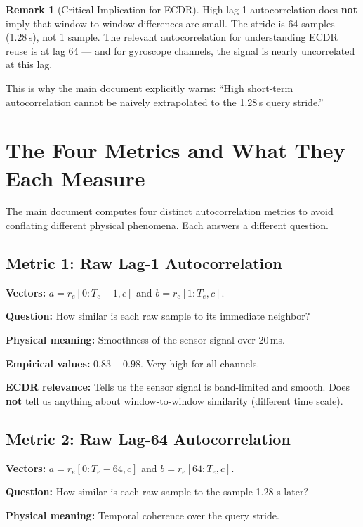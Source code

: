 \documentclass[11pt, a4paper]{article}
\theoremstyle{definition}
\newtheorem{remark}{Remark}[section]
\theoremstyle{plain}
\begin{document}
\begin{remark}[Critical Implication for ECDR]
  High lag-1 autocorrelation does \textbf{not} imply that window-to-window
  differences are small. The stride is 64 samples (1.28\,s), not 1 sample.
  The relevant autocorrelation for understanding ECDR reuse is at lag 64 — and
  for gyroscope channels, the signal is nearly uncorrelated at this lag.

  This is why the main document explicitly warns: ``High short-term autocorrelation
  cannot be naively extrapolated to the 1.28\,s query stride.''
\end{remark}

\section{The Four Metrics and What They Each Measure}

The main document computes four distinct autocorrelation metrics to avoid
conflating different physical phenomena. Each answers a different question.

\subsection{Metric 1: Raw Lag-1 Autocorrelation}

\textbf{Vectors:} $a = r_e[0:T_e-1, c]$ and $b = r_e[1:T_e, c]$.

\textbf{Question:} How similar is each raw sample to its immediate neighbor?

\textbf{Physical meaning:} Smoothness of the sensor signal over 20\,ms.

\textbf{Empirical values:} $0.83 - 0.98$. Very high for all channels.

\textbf{ECDR relevance:} Tells us the sensor signal is band-limited and smooth.
Does \textbf{not} tell us anything about window-to-window similarity (different time scale).

\subsection{Metric 2: Raw Lag-64 Autocorrelation}

\textbf{Vectors:} $a = r_e[0:T_e-64, c]$ and $b = r_e[64:T_e, c]$.

\textbf{Question:} How similar is each raw sample to the sample 1.28 s later?

\textbf{Physical meaning:} Temporal coherence over the query stride.
\end{document}

